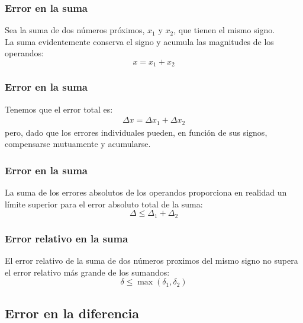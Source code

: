 \documentclass[12pt]{beamer}
\begin{document}
\begin{frame}
\frametitle{Error en la suma}
Sea la suma de dos números próximos, $x_{1}$ y $x_{2}$, que tienen el mismo signo.
\\
\bigskip
\pause
La suma evidentemente conserva el signo y acumula las magnitudes de los operandos:
\pause
\begin{equation}
x = x_{1} + x_{2}
\label{eq:ecuacion_01_14}
\end{equation}
\end{frame}
\begin{frame}
\frametitle{Error en la suma}
Tenemos que el error total es:
\begin{align*}
\Delta x =  \Delta x_{1} + \Delta x_{2}
\end{align*}
\pause
pero, dado que los errores individuales pueden, en función de sus signos, compensarse mutuamente y acumularse.
\end{frame}
\begin{frame}
\frametitle{Error en la suma}
La suma de los errores absolutos de los operandos proporciona en realidad un límite superior para el error absoluto total de la suma:
\begin{equation}
\Delta \leq \Delta_{1} + \Delta_{2}
\label{eq:ecuacion_01_15}
\end{equation}
\end{frame}
\begin{frame}
\frametitle{Error relativo en la suma}
El error relativo de la suma de dos números proximos del mismo signo no supera el error relativo más grande de los sumandos:
\pause
\begin{equation}
\delta \leq \max{(\delta_{1}, \delta_{2})}
\label{eq:ecuacion_01_16}
\end{equation}
\end{frame}

\subsection{Error en la diferencia}
\end{document}
